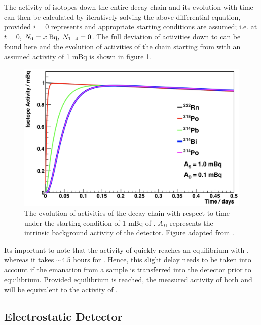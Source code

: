 The activity of isotopes down the entire decay chain and its evolution with time can then be calculated by iteratively solving the above differential equation, provided $i=0$ represents \RnTTT{} and appropriate starting conditions are assumed; i.e. at $t=0$, $N_{0}= x \; \text{Bq}, \; N_{1-4} = 0$. The full deviation of activities down to \PoTOF{} can be found here \cite{mott_2013} and the evolution of activities of the chain starting from \RnTTT{} with an assumed activity of 1 mBq is shown in figure \ref{fig:radon_chain_activity_evolution}.
%
\begin{figure}[t!]
    \centering
    \includegraphics[scale=0.40]{Chapter_4/Figures/radon_chain_activities.png}
    \caption[The evolution of activities of the \RnTTT{} decay chain with respect to time under the starting condition of 1 mBq of \RnTTT{}.]
    {The evolution of activities of the \RnTTT{} decay chain with respect to time under the starting condition of 1 mBq of \RnTTT{}. $A_{D}$ represents the intrinsic background activity of the detector. Figure adapted from \cite{mott_2013}.}
    \label{fig:radon_chain_activity_evolution}
\end{figure}
%
Its important to note that the activity of \PoTOE{} quickly reaches an equilibrium with \RnTTT{}, whereas it takes $\sim4.5$ hours for \PoTOF{}. Hence, this slight delay needs to be taken into account if the emanation from a sample is transferred into the detector prior to equilibrium. Provided equilibrium is reached, the measured activity of both \PoTOE{} and \PoTOF{} will be equivalent to the activity of \RnTTT{}.


\newpage
\subsection{Electrostatic Detector}
\label{secsec:electrostatic_detector}

